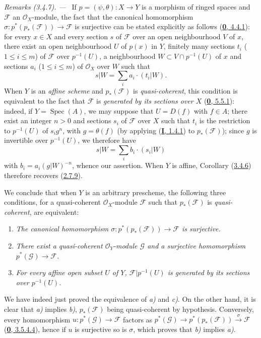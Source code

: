 \par\medskip\noindent\textit{Remarks (3.4.7). ---\ }
If $p=(\psi,\theta):X\to Y$ is a morphism of ringed spaces and
$\mathcal{F}$ an $\mathcal{O}_X$-module, the fact that the canonical homomorphism
$\sigma:p^*(p_*(\mathcal{F}))\to\mathcal{F}$ is surjective can be stated
explicitly as follows (\hyperref[0.4.4.1]{\textbf{0}, 4.4.1}): for every $x\in X$
and every section $s$ of $\mathcal{F}$ over an open neighbourhood $V$ of $x$,
there exist an open neighbourhood $U$ of $p(x)$ in $Y$, finitely many
sections $t_i$ ($1\leq i\leq m$) of $\mathcal{F}$ over $p^{-1}(U)$, a
neighbourhood $W\subset V\cap p^{-1}(U)$ of $x$ and sections $a_i$
($1\leq i\leq m$) of $\mathcal{O}_X$ over $W$ such that
\[
  s|W=\sum_i a_i\cdot(t_i|W).
\]
When $Y$ is an \emph{affine scheme} and $p_*(\mathcal{F})$ is
\emph{quasi-coherent}, this condition is equivalent to the fact that
$\mathcal{F}$ is \emph{generated by its sections over $X$}
(\hyperref[0.5.5.1]{\textbf{0}, 5.5.1}): indeed, if
$Y=\operatorname{Spec}(A)$, we may suppose that $U=D(f)$ with $f\in A$; there
exist an integer $n>0$ and sections $s_i$ of $\mathcal{F}$ over
$X$ such that $t_i$ is the restriction to $p^{-1}(U)$ of $s_ig^n$, with
$g=\theta(f)$ (by applying (\hyperref[I.1.4.1]{\textbf{I}, 1.4.1}) to
$p_*(\mathcal{F})$); since $g$ is invertible over $p^{-1}(U)$, we
therefore have
\[
  s|W=\sum_i b_i\cdot(s_i|W)
\]
with $b_i=a_i(g|W)^{-n}$, whence our assertion. When $Y$ is affine,
Corollary (\hyperref[II.3.4.6]{3.4.6}) therefore recovers
(\hyperref[II.2.7.9]{2.7.9}).


We conclude that when $Y$ is an arbitrary prescheme, the following three
conditions, for a quasi-coherent $\mathcal{O}_X$-module
$\mathcal{F}$ such that $p_*(\mathcal{F})$ is \emph{quasi-coherent}, are
equivalent:
\begin{enumerate}
  \item[a)] \emph{The canonical homomorphism
    $\sigma:p^*(p_*(\mathcal{F}))\to\mathcal{F}$ is surjective.}
  \item[b)] \emph{There exist a quasi-coherent $\mathcal{O}_Y$-module
    $\mathcal{G}$ and a surjective homomorphism
    $p^*(\mathcal{G})\to\mathcal{F}$.}
  \item[c)] \emph{For every affine open subset $U$ of $Y$,
    $\mathcal{F}|p^{-1}(U)$ is generated by its sections over
    $p^{-1}(U)$.}
\end{enumerate}
We have indeed just proved the equivalence of \emph{a)} and \emph{c)}. On the
other hand, it is clear that \emph{a)} implies \emph{b)}, $p_*(\mathcal{F})$
being quasi-coherent by hypothesis. Conversely, every homomorphism
$u:p^*(\mathcal{G})\to\mathcal{F}$ factors as
$p^*(\mathcal{G})\to p^*(p_*(\mathcal{F}))\xrightarrow{\sigma}\mathcal{F}$
(\hyperref[0.3.5.4.4]{\textbf{0}, 3.5.4.4}), hence if $u$ is surjective so is
$\sigma$, which proves that \emph{b)} implies \emph{a)}.

